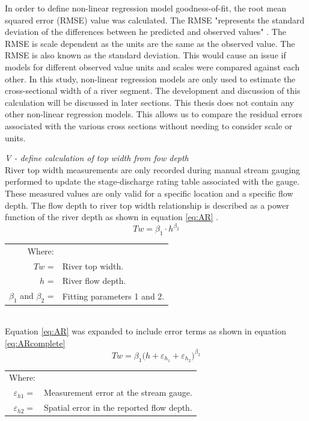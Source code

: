 \begin{linenumbers}
In order to define non-linear regression model goodness-of-fit, the root mean squared error (RMSE) value was calculated.  The RMSE "represents the standard deviation of the differences between he predicted and observed values" \citep{Wiki:RMSE}.  The RMSE is scale dependent as the units are the same as the observed value.  The RMSE is also known as the standard deviation.  This would cause an issue if models for different observed value units and scales were compared against each other.  In this study, non-linear regression models are only used to estimate the cross-sectional width of a river segment.  The development and discussion of this calculation will be discussed in later sections.  This thesis does not contain any other non-linear regression models.  This allows us to compare the residual errors associated with the various cross sections without needing to consider scale or units.

\emph{V - define calculation of top width from fow depth}\\
River top width measurements are only recorded during manual stream gauging performed to update the stage-discharge rating table associated with the gauge.  These measured values are only valid for a specific location and a specific flow depth.  The flow depth to river top width relationship is described as a power function of the river depth as shown in equation \ref{eq:AR} \citep{Buhman2002,Gates1996}.  
\begin{equation}
	Tw=\beta_{1} \cdot h^{\beta_{2}}
	\label{eq:AR}
\end{equation}
\begin{tabular}{rl}
	Where: & \\
	$Tw$ =&River top width. \\
	$h$ =&River flow depth. \\
	$\beta_{1}$ and $\beta_{2}$ =&Fitting parameters 1 and 2. \\
\end{tabular} \\

Equation \ref{eq:AR} was expanded to include error terms as shown in equation \ref{eq:ARcomplete}
\begin{equation}
	\label{eq:ARcomplete}
	Tw=\beta_1 \big( h+\varepsilon_{h_1} + \varepsilon_{h_2} \big) ^ {\beta_2}
\end{equation}
\begin{tabular}{r l}
	Where:&\\
	$\varepsilon_{h1}=$& Measurement error at the stream gauge.\\
	$\varepsilon_{h2}=$& Spatial error in the reported flow depth.\\
\end{tabular}\\


\end{linenumbers}
